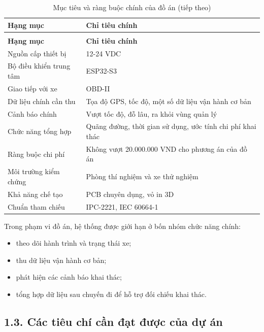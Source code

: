 \documentclass[a4paper]{extarticle}
\newcommand{\thesissettableid}[2]{%
  \renewcommand{\thetable}{#1}%
  \renewcommand{\theHtable}{#2}%
}
\providecommand{\tightlist}{%
  \setlength{\itemsep}{0pt}\setlength{\parskip}{0pt}}
\begin{document}
{\thesissettableid{1.1}{condensed-r2-bang-1-1-muc-tieu-va-rang-buoc-chinh-cua-do-an}
\def\LTcaptype{table}
\begin{longtable}{|L{(\linewidth - 2\tabcolsep) * }|L{(\linewidth - 2\tabcolsep) * }|}
\caption{Mục tiêu và ràng buộc chính của đồ án}\label{tab:condensed-r2-bang-1-1-muc-tieu-va-rang-buoc-chinh-cua-do-an}\\
\hline
\textbf{Hạng mục} & \textbf{Chỉ tiêu chính} \\
\hline
\endfirsthead
\caption[]{Mục tiêu và ràng buộc chính của đồ án (tiếp theo)}\\
\hline
\textbf{Hạng mục} & \textbf{Chỉ tiêu chính} \\
\hline
\endhead
\endfoot
\endlastfoot
Nguồn cấp thiết bị & 12-24 VDC \\\hline
Bộ điều khiển trung tâm & ESP32-S3 \\\hline
Giao tiếp với xe & OBD-II \\\hline
Dữ liệu chính cần thu & Tọa độ GPS, tốc độ, một số dữ liệu vận hành cơ bản \\\hline
Cảnh báo chính & Vượt tốc độ, đỗ lâu, ra khỏi vùng quản lý \\\hline
Chức năng tổng hợp & Quãng đường, thời gian sử dụng, ước tính chi phí khai thác \\\hline
Ràng buộc chi phí & Không vượt 20.000.000 VND cho phương án của đồ án \\\hline
Môi trường kiểm chứng & Phòng thí nghiệm và xe thử nghiệm \\\hline
Khả năng chế tạo & PCB chuyên dụng, vỏ in 3D \\\hline
Chuẩn tham chiếu & IPC-2221, IEC 60664-1 \\\hline
\end{longtable}
}
Trong phạm vi đồ án, hệ thống được giới hạn ở bốn nhóm chức năng chính:

\begin{itemize}
\tightlist
\item
  theo dõi hành trình và trạng thái xe;
\item
  thu dữ liệu vận hành cơ bản;
\item
  phát hiện các cảnh báo khai thác;
\item
  tổng hợp dữ liệu sau chuyến đi để hỗ trợ đối chiếu khai thác.
\end{itemize}

\subsection{1.3. Các tiêu chí cần đạt được của dự án}\label{cuxe1c-tiuxeau-chuxed-cux1ea7n-ux111ux1ea1t-ux111ux1b0ux1ee3c-cux1ee7a-dux1ef1-uxe1n}
\end{document}
